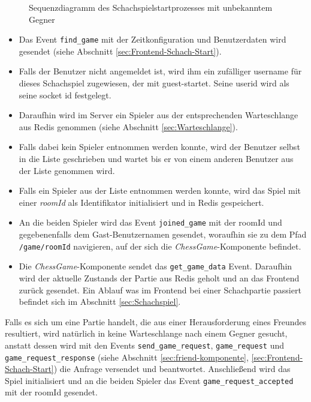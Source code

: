 \begin{figure}[h!]
\begin{adjustbox}{width=\textwidth}
\begin{sequencediagram}[scale=0.2]
    
    
  \end{sequencediagram}
  \end{adjustbox}
  
  \caption{Sequenzdiagramm des Schachspielstartprozesses mit unbekanntem Gegner}
  \label{fig:sequence_chess_start}
\end{figure}


\begin{itemize}
\item Das Event \verb|find_game| mit der Zeitkonfiguration und Benutzerdaten wird gesendet (siehe Abschnitt \ref{sec:Frontend-Schach-Start}).
\item Falls der Benutzer nicht angemeldet ist, wird ihm  ein zufälliger username für dieses Schachspiel zugewiesen, der mit \glqq guest-\grqq{ }startet. Seine userid wird als seine socket id festgelegt.
\item Daraufhin wird im Server ein Spieler aus der entsprechenden Warteschlange aus Redis genommen (siehe Abschnitt \ref{sec:Warteschlange}).
\item Falls dabei kein Spieler entnommen werden konnte, wird der Benutzer selbst in die Liste geschrieben und wartet bis er von einem anderen Benutzer aus der Liste genommen wird.
\item Falls ein Spieler aus der Liste entnommen werden konnte, wird das Spiel mit einer \textit{roomId} als Identifikator initialisiert und in Redis gespeichert.
\item An die beiden Spieler wird das Event \verb|joined_game| mit der roomId und gegebenenfalls dem Gast-Benutzernamen gesendet, woraufhin sie zu dem Pfad \verb|/game/roomId| navigieren, auf der sich die \textit{ChessGame}-Komponente befindet.
\item Die \textit{ChessGame}-Komponente sendet das \verb|get_game_data| Event. Daraufhin wird der aktuelle Zustands der Partie aus Redis geholt und an das Frontend zurück gesendet. Ein Ablauf was im Frontend bei einer Schachpartie passiert befindet sich im Abschnitt \ref{sec:Schachspiel}.
\end{itemize}

Falls es sich um eine Partie handelt, die aus einer Herausforderung eines Freundes resultiert, wird natürlich in keine Warteschlange nach einem Gegner gesucht, anstatt dessen wird mit den Events \verb|send_game_request|, \verb|game_request| und \verb|game_request_response| (siehe Abschnitt \ref{sec:friend-komponente}, \ref{sec:Frontend-Schach-Start}) die Anfrage versendet und beantwortet. Anschließend wird das Spiel initialisiert und an die beiden Spieler das Event \verb|game_request_accepted| mit der roomId gesendet.

